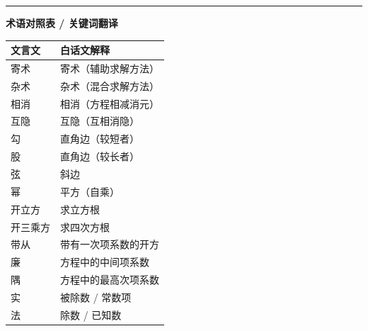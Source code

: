 \documentclass[10pt,a4paper]{article}
\newcommand{\longline}{\noindent\rule{\textwidth}{0.4pt}}
\begin{document}
\vspace{1cm}
\longline

\begin{center}
{\small\color{notecolor}
\textbf{术语对照表 / 关键词翻译}\\[0.3em]
\begin{tabular}{ll}
\textcolor{classicalcolor}{文言文} & \textcolor{moderncolor}{白话文解释}\\
\hline
寄术 & 寄术（辅助求解方法）\\
杂术 & 杂术（混合求解方法）\\
相消 & 相消（方程相减消元）\\
互隐 & 互隐（互相消隐）\\
勾 & 直角边（较短者）\\
股 & 直角边（较长者）\\
弦 & 斜边\\
幂 & 平方（自乘）\\
开立方 & 求立方根\\
开三乘方 & 求四次方根\\
带从 & 带有一次项系数的开方\\
廉 & 方程中的中间项系数\\
隅 & 方程中的最高次项系数\\
实 & 被除数 / 常数项\\
法 & 除数 / 已知数\\
\end{tabular}
}
\end{center}
\end{document}
